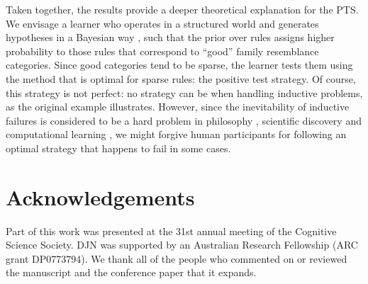\documentclass{apa}
\begin{document}
Taken together, the results provide a deeper theoretical explanation for the PTS. We envisage a learner who operates in a structured world and generates hypotheses in a Bayesian way \cite{gettysfisher79}, such that the prior over rules assigns higher probability to those rules that correspond to ``good'' family resemblance categories. Since good categories tend to be sparse, the learner tests them using the method that is optimal for sparse rules: the positive test strategy. Of course, this strategy is not perfect: no strategy can be when handling inductive problems, as the original  example illustrates. However, since the inevitability of inductive failures is considered to be a hard problem in philosophy \cite{hume1739,Goodman1955,goodman72}, scientific discovery \cite{feyerabend75} and computational learning \cite{Wolpert1997}, we might forgive human participants for following an optimal strategy that happens to fail in some cases.


\section{Acknowledgements}

Part of this work was presented at the 31st annual meeting of the Cognitive Science Society. DJN was supported by an Australian Research Fellowship (ARC grant DP0773794). We thank all of the people who commented on or reviewed the manuscript and the conference paper that it expands.


\end{document}
